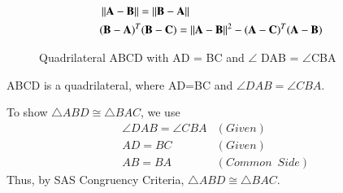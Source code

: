 \begin{align}
 & \left\lVert\mathbf{A}-\mathbf{B}\right\rVert  =    \left\lVert\mathbf{B}-\mathbf{A}\right\rVert \\
 & (\mathbf{B}-\mathbf{A})^T(\mathbf{B}-\mathbf{C})  =  \left\lVert\mathbf{A}-\mathbf{B}\right\rVert^2 - (\mathbf{A}-\mathbf{C})^T(\mathbf{A}-\mathbf{B}) 
\end{align}
\begin{figure}[!htb]
	\centering
	\centering
	\resizebox{\columnwidth}{!}{}
	\caption{Quadrilateral ABCD with AD = BC and $\angle$ DAB = $\angle$CBA}
\end{figure}
ABCD is a quadrilateral, where AD=BC and $\angle DAB= \angle CBA$.

To show $\triangle ABD \cong \triangle BAC$, we use
\begin{align}
	& \angle DAB = \angle CBA & (Given) \\
	& AD = BC & (Given) \\
	& AB = BA & (Common \enspace Side)
\end{align}
Thus, by SAS Congruency Criteria, $\triangle ABD \cong \triangle BAC$.

